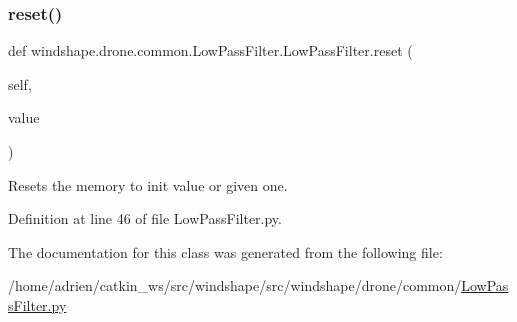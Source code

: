 \subsubsection{\texorpdfstring{reset()}{reset()}}
{\footnotesize\ttfamily def windshape.\+drone.\+common.\+Low\+Pass\+Filter.\+Low\+Pass\+Filter.\+reset (\begin{DoxyParamCaption}\item[{}]{self,  }\item[{}]{value }\end{DoxyParamCaption})}

\begin{DoxyVerb}Resets the memory to init value or given one.\end{DoxyVerb}
 

Definition at line 46 of file Low\+Pass\+Filter.\+py.



The documentation for this class was generated from the following file\+:\begin{DoxyCompactItemize}
\item 
/home/adrien/catkin\+\_\+ws/src/windshape/src/windshape/drone/common/\mbox{\hyperlink{_low_pass_filter_8py}{Low\+Pass\+Filter.\+py}}\end{DoxyCompactItemize}
